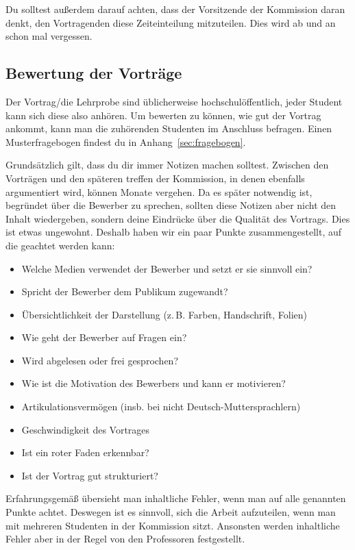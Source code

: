 Du solltest außerdem darauf achten, dass der Vorsitzende der Kommission daran denkt, den Vortragenden diese Zeiteinteilung mitzuteilen. Dies wird ab und an schon mal vergessen.

\subsection{Bewertung der Vorträge}
Der Vortrag/die Lehrprobe sind üblicherweise hochschulöffentlich, jeder Student kann sich
diese also anhören. Um bewerten zu können, wie gut der Vortrag ankommt, kann man die zuhörenden Studenten
im Anschluss befragen. Einen Musterfragebogen findest du in Anhang~\ref{sec:fragebogen}.

Grundsätzlich gilt, dass du dir immer Notizen machen solltest. Zwischen den Vorträgen und den späteren treffen der Kommission, in denen ebenfalls argumentiert wird, können Monate vergehen.
Da es später notwendig ist, begründet über die Bewerber zu sprechen, sollten diese Notizen aber nicht den Inhalt wiedergeben, sondern deine Eindrücke über die Qualität des Vortrags. Dies ist etwas ungewohnt. Deshalb haben wir ein paar Punkte zusammengestellt, auf die geachtet werden kann:
\begin{itemize} %
    \item Welche Medien verwendet der Bewerber und setzt er sie sinnvoll ein?
    \item Spricht der Bewerber dem Publikum zugewandt?
    \item Übersichtlichkeit der Darstellung (z.\,B. Farben, Handschrift, Folien)
    \item Wie geht der Bewerber auf Fragen ein?
    \item Wird abgelesen oder frei gesprochen?
    \item Wie ist die Motivation des Bewerbers und kann er motivieren?
    \item Artikulationsvermögen (insb. bei nicht Deutsch-Muttersprachlern)
    \item Geschwindigkeit des Vortrages
    \item Ist ein roter Faden erkennbar?
    \item Ist der Vortrag gut strukturiert?
\end{itemize}
Erfahrungsgemäß übersieht man inhaltliche Fehler, wenn man auf alle genannten Punkte achtet. Deswegen ist es sinnvoll, sich die Arbeit aufzuteilen, wenn man mit mehreren Studenten in der Kommission sitzt. Ansonsten werden inhaltliche Fehler aber in der Regel von den Professoren festgestellt.

